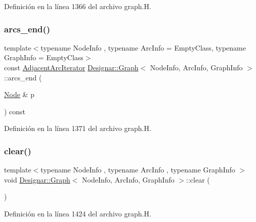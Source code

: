 Definición en la línea 1366 del archivo graph.\+H.

\mbox{\label{class_designar_1_1_graph_a305a413007d60401317366c92245bfa4}} 
\subsubsection{\texorpdfstring{arcs\+\_\+end()}{arcs\_end()}\hspace{0.1cm}{\footnotesize\ttfamily [4/4]}}
{\footnotesize\ttfamily template$<$typename Node\+Info , typename Arc\+Info  = Empty\+Class, typename Graph\+Info  = Empty\+Class$>$ \\
const \hyperlink{class_designar_1_1_graph_1_1_adjacent_arc_iterator}{Adjacent\+Arc\+Iterator} \hyperlink{class_designar_1_1_graph}{Designar\+::\+Graph}$<$ Node\+Info, Arc\+Info, Graph\+Info $>$\+::arcs\+\_\+end (\begin{DoxyParamCaption}\item[{\hyperlink{class_designar_1_1_graph_a5dfc7dba9d092ac489c72e40390c37d0}{Node} \&}]{p }\end{DoxyParamCaption}) const\hspace{0.3cm}{\ttfamily [inline]}}



Definición en la línea 1371 del archivo graph.\+H.

\mbox{\label{class_designar_1_1_graph_acfebca533d00dae0c40b0dd88f64296c}} 
\subsubsection{\texorpdfstring{clear()}{clear()}}
{\footnotesize\ttfamily template$<$typename Node\+Info , typename Arc\+Info , typename Graph\+Info $>$ \\
void \hyperlink{class_designar_1_1_graph}{Designar\+::\+Graph}$<$ Node\+Info, Arc\+Info, Graph\+Info $>$\+::clear (\begin{DoxyParamCaption}{ }\end{DoxyParamCaption})}



Definición en la línea 1424 del archivo graph.\+H.


